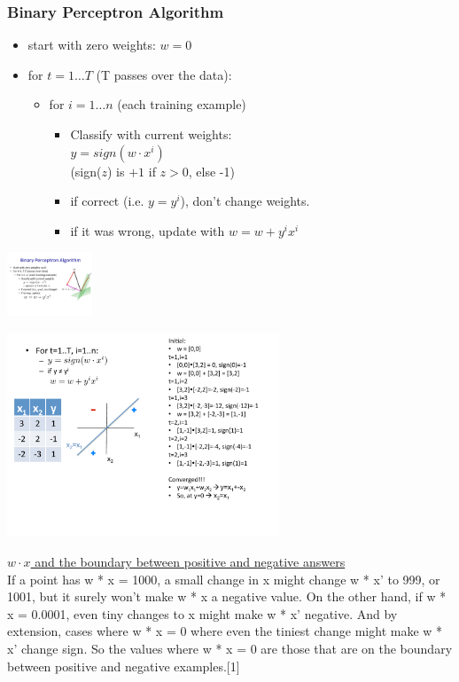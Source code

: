  \subsubsection{Binary Perceptron Algorithm}
 \begin{itemize}
 	\item start with zero weights: $w=0$
	\item for $ t = 1 \dots T$ (T passes over the data):
		\begin{itemize}
			\item for $i = 1 \dots n$ (each training example)
			\begin{itemize}
				\item  Classify with current weights: \hfill \\
					$ y = sign(w \cdot x^i)$ \hfill \\
					(sign($z$)  is $+1$ if $z > 0$, else -1) \hfill \\
				\item if correct (i.e. $y = y^i$), don't change weights.
				\item if it was wrong, update with $w = w + y^i x^i$
			\end{itemize}
		\end{itemize}
 \end{itemize}
 \includegraphics[width=1.0in]{figures/binary_perceptron_rule.pdf}
  
 \includegraphics[width=3.2in]{figures/perceptron_chugging_example.pdf}
 
 \underline{$w \cdot x$ and the boundary between positive and negative answers} \hfill \\
If a point has w * x = 1000, a small change in x might change w * x' to 999, or 1001, but it surely won't make w * x a negative value. On the other hand, if w * x = 0.0001, even tiny changes to x might make w * x' negative. And by extension, cases where w * x = 0 where even the tiniest change might make w * x' change sign. So the values where w * x = 0 are those that are on the boundary between positive and negative examples.[1]

